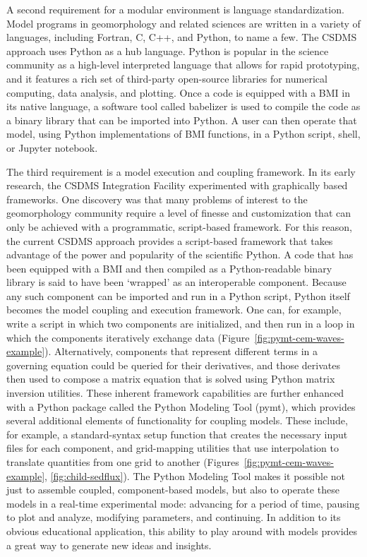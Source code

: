 \documentclass[10pt,twocolumn,preprint]{elsarticle}
\begin{document}
A second requirement for a modular environment is language standardization. Model programs in geomorphology and related sciences are written in a variety of languages, including Fortran, C, C++, and Python, to name a few. The CSDMS approach uses Python as a hub language. Python is  popular in the science community as a high-level interpreted language that allows for rapid prototyping, and it features a rich set of third-party open-source libraries for numerical computing, data analysis, and plotting. Once a code is equipped with a BMI in its native language, a software tool called babelizer is used to compile the code as a binary library that can be imported into Python. A user can then operate that model, using Python implementations of BMI functions, in a Python script, shell, or Jupyter notebook.

The third requirement is a model execution and coupling framework. In its early research, the CSDMS Integration Facility experimented with graphically based frameworks. One discovery was that many problems of interest to the geomorphology community require a level of finesse and customization that can only be achieved with a programmatic, script-based framework.  For this reason, the current CSDMS approach provides a script-based framework that takes advantage of the power and popularity of the scientific Python. A code that has been equipped with a BMI and then compiled as a Python-readable binary library is said to have been `wrapped' as an interoperable component. Because any such component can be imported and run in a Python script, Python itself becomes the model coupling and execution framework. One can, for example, write a script in which two components are initialized, and then run in a loop in which the components iteratively exchange data (Figure~\ref{fig:pymt-cem-waves-example}). Alternatively, components that represent different terms in a governing equation could be queried for their derivatives, and those derivates then used to compose a matrix equation that is solved using Python matrix inversion utilities. These inherent framework capabilities are further enhanced with a Python package called the Python Modeling Tool (pymt), which provides several additional elements of functionality for coupling models. These include, for example, a standard-syntax setup function that creates the necessary input files for each component, and grid-mapping utilities that use interpolation to translate quantities from one grid to another (Figures~\ref{fig:pymt-cem-waves-example}, \ref{fig:child-sedflux}). The Python Modeling Tool makes it possible not just to assemble coupled, component-based models, but also to operate these models in a real-time experimental mode: advancing for a period of time, pausing to plot and analyze, modifying parameters, and continuing. In addition to its obvious educational application, this ability to play around with models provides a great way to generate new ideas and insights.
\end{document}
